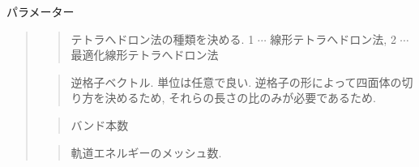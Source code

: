 \documentclass[letterpaper,10pt,dvipdfmx,openany]{sphinxmanual}
\begin{document}
\sphinxAtStartPar
パラメーター
\begin{quote}

\begin{sphinxVerbatim}[commandchars=\\\{\}]
\end{sphinxVerbatim}
\begin{quote}

\sphinxAtStartPar
テトラへドロン法の種類を決める.
1 \(\cdots\) 線形テトラへドロン法,
2 \(\cdots\) 最適化線形テトラへドロン法 {\hyperref[\detokenize{ref:ref}]{}}
\end{quote}

\begin{sphinxVerbatim}[commandchars=\\\{\}]
\end{sphinxVerbatim}
\begin{quote}

\sphinxAtStartPar
逆格子ベクトル. 単位は任意で良い.
逆格子の形によって四面体の切り方を決めるため,
それらの長さの比のみが必要であるため.
\end{quote}

\begin{sphinxVerbatim}[commandchars=\\\{\}]
\end{sphinxVerbatim}
\begin{quote}

\sphinxAtStartPar
バンド本数
\end{quote}

\begin{sphinxVerbatim}[commandchars=\\\{\}]
\end{sphinxVerbatim}
\begin{quote}

\sphinxAtStartPar
軌道エネルギーのメッシュ数.
\end{quote}


\end{quote}
\end{document}
